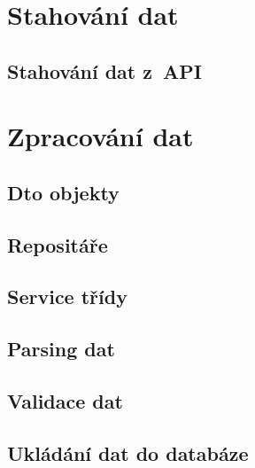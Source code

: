 \newpage

\section{Stahování dat}
\subsection{Stahování dat z~API}

\section{Zpracování dat}
\subsection{Dto objekty}
\subsection{Repositáře}
\subsection{Service třídy}
\subsection{Parsing dat}
\subsection{Validace dat}
\subsection{Ukládání dat do databáze}